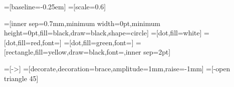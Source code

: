 =[baseline=-0.25em]
=[scale=0.6]

=[inner sep=0.7mm,minimum width=0pt,minimum height=0pt,fill=black,draw=black,shape=circle]
=[dot,fill=white]
=[dot,fill=red,font=\footnotesize\color{white}]
=[dot,fill=green,font=\footnotesize]
=[rectangle,fill=yellow,draw=black,font=\footnotesize,inner sep=2pt]

=[->]
=[decorate,decoration={brace,amplitude=1mm,raise=-1mm}]
=[-open triangle 45]
